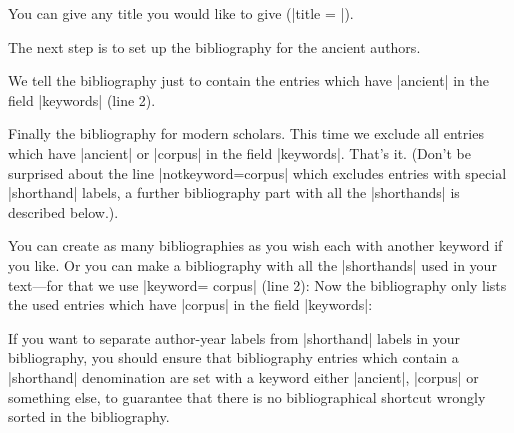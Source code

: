 \documentclass[a4paper,
10pt,
greek,
french,
spanish,
italian,
ngerman,
english,
]{ltxdoc}
\begin{document}
\begin{refsection}
    \nocite{*}
    \renewcommand\bibfont{\normalfont\footnotesize}
    \setlength{\labwidthsameline}{6em} 
\begin{example}
\printbibheading[%
  heading=bibliography,%
  title={Bibliography}] %
\end{example}
You can give any title you would like to give (|title = |).

The next step is to set up the bibliography for the ancient authors.

\setlength{\labwidthsameline}{6.5em} 
\begin{example}
\printbibliography[%
  keyword=ancient,%
  heading=subbibliography,
  title={Ancient authors and works}]
\end{example}
We tell the bibliography just to contain the entries which have |ancient| in the field |keywords| (line 2).


Finally the bibliography for modern scholars.
This time we exclude all entries which have |ancient| or |corpus| in the field |keywords|. 
That’s it.
(Don't be surprised about the line |notkeyword=corpus| which excludes entries with special |shorthand| labels, a further bibliography part with all the |shorthands| is described below.).

\setlength{\labwidthsameline}{7em} 
\begin{example}
\printbibliography[%
  notkeyword=ancient,%
  notkeyword=corpus,%
  heading=subbibliography,
  title={Secondary literature}]
\end{example}



You can create as many bibliographies as you wish each with another keyword if you like.
Or you can make a bibliography with all the |shorthands| used in your text---for that we use |keyword= {corpus}| (line 2):
Now the bibliography only lists the used entries which have |corpus| in the field |keywords|:
\begin{example}
\printbibliography[%
keyword={corpus},
heading=subbibliography,
title={Abbreviation of corpora}]
\label{bib:corpus}
\end{example}

\begin{marker}
 If you want to separate author-year labels from |shorthand| labels in your bibliography,  
 you should ensure that bibliography entries which contain a |shorthand| denomination 
are set with a keyword either |ancient|, |corpus| or something else, to guarantee that there is 
no bibliographical shortcut wrongly sorted in the bibliography.
\end{marker}



\end{refsection}
\end{document}
